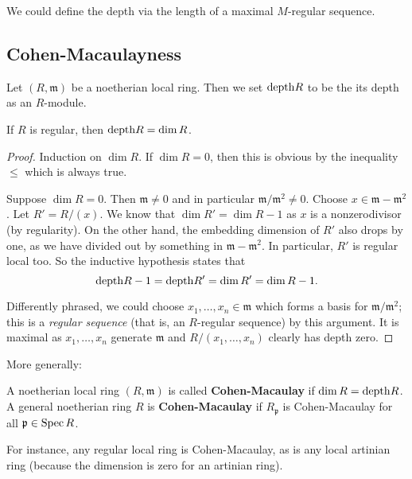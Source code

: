 \begin{remark} 
We could define the depth via the length of a maximal
$M$-regular sequence.
\end{remark} 


\subsection{Cohen-Macaulayness}

\begin{definition} 
Let $(R, \mathfrak{m})$ be a noetherian local ring. Then 
we set $\mathrm{depth} R$ to be the its depth as an $R$-module.
\end{definition} 




\begin{example} 
If $R$ is regular, then $\mathrm{depth} R = \dim R$.
\end{example} 
\begin{proof} 
Induction on $\dim R$. If $\dim R=0$, then this is obvious by
the inequality
$\leq $ which is always true.

Suppose $\dim R = 0$. Then $\mathfrak{m} \neq 0$ and in
particular
$\mathfrak{m}/\mathfrak{m}^2 \neq 0$. Choose $x \in
\mathfrak{m}-
\mathfrak{m}^2$. Let $R'=R/(x)$. We know that $\dim R' = \dim
R-1$ as $x$ is a
nonzerodivisor (by regularity). On the other hand, the embedding
dimension of $R'$ also drops
by one, as we have divided out by something in $\mathfrak{m} -
\mathfrak{m}^2$.
In particular, $R'$ is regular local too. So the inductive
hypothesis states
that
\[\mathrm{depth} R-1 =  \mathrm{depth} R' = \dim R' = \dim R -1.   \]

Differently phrased, we could choose $x_1, \dots, x_n \in
\mathfrak{m}$ which forms a basis for
$\mathfrak{m}/\mathfrak{m}^2$; this is a
\emph{regular sequence} (that is, an $R$-regular sequence) by
this argument. It
is maximal as $x_1, \dots, x_n$ generate $\mathfrak{m}$ and
$R/(x_1, \dots,
x_n)$ clearly has depth zero.
\end{proof} 

More generally:
\begin{definition} 
A noetherian local ring $(R, \mathfrak{m})$ is called
\textbf{Cohen-Macaulay}
if $\dim R = \mathrm{depth} R$. A general noetherian ring $R$ is
\textbf{Cohen-Macaulay} if
$R_{\mathfrak{p}}$ is Cohen-Macaulay for all $\mathfrak{p} \in
\operatorname{Spec} R$.
\end{definition} 
For instance, any regular local ring is Cohen-Macaulay, as is
any local
artinian ring (because the dimension is zero for an artinian
ring).

